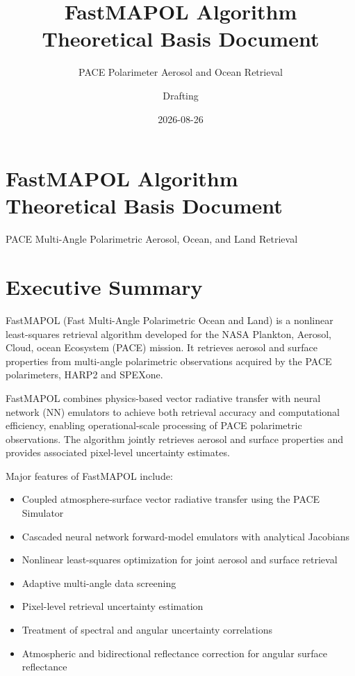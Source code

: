 \documentclass[
  letterpaper,
  open=any]{scrbook}
\title{FastMAPOL Algorithm Theoretical Basis Document}
\subtitle{PACE Polarimeter Aerosol and Ocean Retrieval}
\author{Drafting}
\date{2026-08-26}
\providecommand{\tightlist}{%
  \setlength{\itemsep}{0pt}\setlength{\parskip}{0pt}}
\renewcommand*\contentsname{Table of contents}
\newcommand\contentsname{Table of contents}
\begin{document}
\frontmatter
\maketitle

\renewcommand*\contentsname{Table of contents}
{
\hypersetup{linkcolor=}
\setcounter{tocdepth}{2}
\tableofcontents
}
\listoffigures
\listoftables

\mainmatter
{}

\chapter{FastMAPOL Algorithm Theoretical Basis
Document}\label{fastmapol-algorithm-theoretical-basis-document}

PACE Multi-Angle Polarimetric Aerosol, Ocean, and Land Retrieval

\hfill\break


\chapter{Executive Summary}\label{executive-summary}

FastMAPOL (Fast Multi-Angle Polarimetric Ocean and Land) is a nonlinear
least-squares retrieval algorithm developed for the NASA Plankton,
Aerosol, Cloud, ocean Ecosystem (PACE) mission. It retrieves aerosol and
surface properties from multi-angle polarimetric observations acquired
by the PACE polarimeters, HARP2 and SPEXone.

FastMAPOL combines physics-based vector radiative transfer with neural
network (NN) emulators to achieve both retrieval accuracy and
computational efficiency, enabling operational-scale processing of PACE
polarimetric observations. The algorithm jointly retrieves aerosol and
surface properties and provides associated pixel-level uncertainty
estimates.

Major features of FastMAPOL include:

\begin{itemize}
\tightlist
\item
  Coupled atmosphere-surface vector radiative transfer using the PACE
  Simulator
\item
  Cascaded neural network forward-model emulators with analytical
  Jacobians
\item
  Nonlinear least-squares optimization for joint aerosol and surface
  retrieval
\item
  Adaptive multi-angle data screening
\item
  Pixel-level retrieval uncertainty estimation
\item
  Treatment of spectral and angular uncertainty correlations
\item
  Atmospheric and bidirectional reflectance correction for angular
  surface reflectance
\end{itemize}
\end{document}
